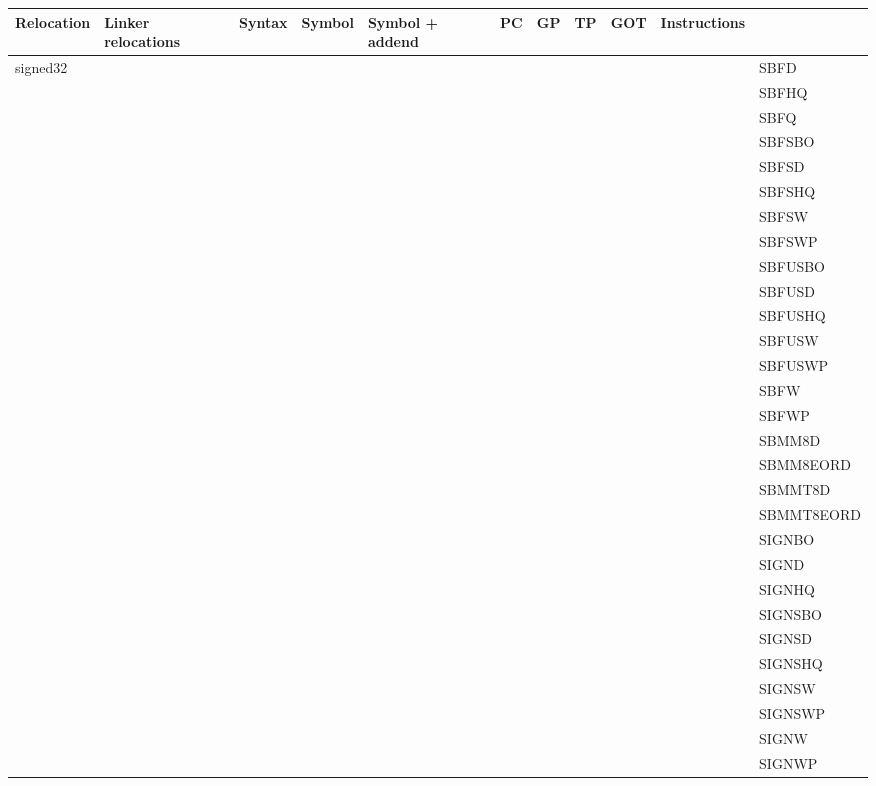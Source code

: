 {\tiny
\begin{tabular}{|l|l|l|l|l|l|l|l|l|l|l|} \hline
\textsf{Relocation} & \textsf{Linker relocations} & \textsf{Syntax} & \textsf{Symbol} & \textsf{Symbol + addend} & \textsf{PC} & \textsf{GP} & \textsf{TP} & \textsf{GOT} & \textsf{Instructions} \\
\hline
\textsf{signed32} & & & & & & & & & & \textsf{SBFD} \\
 & & & & & & & & & & \textsf{SBFHQ} \\
 & & & & & & & & & & \textsf{SBFQ} \\
 & & & & & & & & & & \textsf{SBFSBO} \\
 & & & & & & & & & & \textsf{SBFSD} \\
 & & & & & & & & & & \textsf{SBFSHQ} \\
 & & & & & & & & & & \textsf{SBFSW} \\
 & & & & & & & & & & \textsf{SBFSWP} \\
 & & & & & & & & & & \textsf{SBFUSBO} \\
 & & & & & & & & & & \textsf{SBFUSD} \\
 & & & & & & & & & & \textsf{SBFUSHQ} \\
 & & & & & & & & & & \textsf{SBFUSW} \\
 & & & & & & & & & & \textsf{SBFUSWP} \\
 & & & & & & & & & & \textsf{SBFW} \\
 & & & & & & & & & & \textsf{SBFWP} \\
 & & & & & & & & & & \textsf{SBMM8D} \\
 & & & & & & & & & & \textsf{SBMM8EORD} \\
 & & & & & & & & & & \textsf{SBMMT8D} \\
 & & & & & & & & & & \textsf{SBMMT8EORD} \\
 & & & & & & & & & & \textsf{SIGNBO} \\
 & & & & & & & & & & \textsf{SIGND} \\
 & & & & & & & & & & \textsf{SIGNHQ} \\
 & & & & & & & & & & \textsf{SIGNSBO} \\
 & & & & & & & & & & \textsf{SIGNSD} \\
 & & & & & & & & & & \textsf{SIGNSHQ} \\
 & & & & & & & & & & \textsf{SIGNSW} \\
 & & & & & & & & & & \textsf{SIGNSWP} \\
 & & & & & & & & & & \textsf{SIGNW} \\
 & & & & & & & & & & \textsf{SIGNWP} \\

\end{tabular}}
